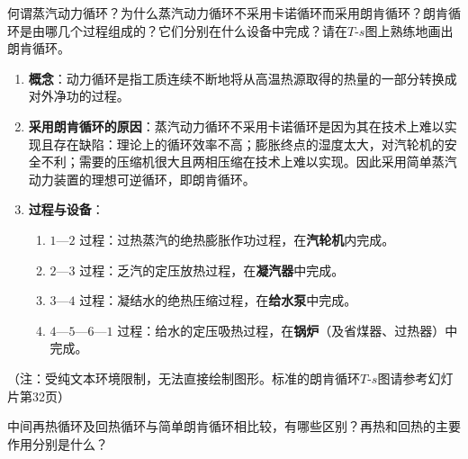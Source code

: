 \begin{problem}
何谓蒸汽动力循环？为什么蒸汽动力循环不采用卡诺循环而采用朗肯循环？朗肯循环是由哪几个过程组成的？它们分别在什么设备中完成？请在\(T\)-\(s\)图上熟练地画出朗肯循环。
\end{problem}

\begin{solution}
\begin{enumerate}
  \item \textbf{概念}：动力循环是指工质连续不断地将从高温热源取得的热量的一部分转换成对外净功的过程。
  \item \textbf{采用朗肯循环的原因}：蒸汽动力循环不采用卡诺循环是因为其在技术上难以实现且存在缺陷：理论上的循环效率不高；膨胀终点的湿度太大，对汽轮机的安全不利；需要的压缩机很大且两相压缩在技术上难以实现。因此采用简单蒸汽动力装置的理想可逆循环，即朗肯循环。
  \item \textbf{过程与设备}：
  \begin{enumerate}
    \item \(1\)—\(2\) 过程：过热蒸汽的绝热膨胀作功过程，在\textbf{汽轮机}内完成。
    \item \(2\)—\(3\) 过程：乏汽的定压放热过程，在\textbf{凝汽器}中完成。
    \item \(3\)—\(4\) 过程：凝结水的绝热压缩过程，在\textbf{给水泵}中完成。
    \item \(4\)—\(5\)—\(6\)—\(1\) 过程：给水的定压吸热过程，在\textbf{锅炉}（及省煤器、过热器）中完成。
  \end{enumerate}
\end{enumerate}

（注：受纯文本环境限制，无法直接绘制图形。标准的朗肯循环\(T\)-\(s\)图请参考幻灯片第32页）
\end{solution}

\begin{problem}
中间再热循环及回热循环与简单朗肯循环相比较，有哪些区别？再热和回热的主要作用分别是什么？
\end{problem}

